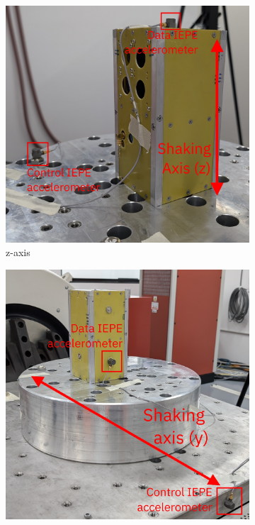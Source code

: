 \documentclass{report}
\begin{document}
\begin{figure}[H]
  \begin{subfigure}{0.32\textwidth}
    \includegraphics[width=\linewidth]{images/z-axis-setup.jpg}
    \caption{z-axis}
  \end{subfigure}
  \begin{subfigure}{0.32\textwidth}
    \includegraphics[width=\linewidth]{images/y-axis-setup.jpg}

\end{subfigure}
\end{figure}
\end{document}
